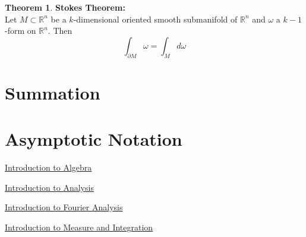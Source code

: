 \documentclass{book}
\theoremstyle{definition}
\newtheorem{thm}[definition]{Theorem}
\newcommand{\om}{\omega}
\newcommand{\R}{\mathbb{R}}
\DeclareMathOperator*{\0}{\mbf{0}}
\DeclareMathOperator*{\1}{\mbf{1}}
\begin{document}
	\begin{thm}\textbf{Stokes Theorem:}\\
		Let $M \subset \R^n$ be a $k$-dimensional oriented smooth submanifold of $\R^n$ and $\om$ a $k-1$-form on $\R^n$. Then $$\int_{\partial M} \om = \int_M d \om$$
	\end{thm}



	

\appendix

\chapter{Summation}


\newpage	

\chapter{Asymptotic Notation}








\backmatter
\begin{thebibliography}{4}
	 \href{https://github.com/carsonaj/Mathematics/blob/master/Introduction\%20to\%20Algebra/Introduction\%20to\%20Algebra.pdf}{Introduction to Algebra}
	
	  \href{https://github.com/carsonaj/Mathematics/blob/master/Introduction\%20to\%20Analysis/Introduction\%20to\%20Analysis.pdf}{Introduction to Analysis}	
	
	  \href{https://github.com/carsonaj/Mathematics/blob/master/Introduction\%20to\%20Fourier\%20Analysis/Introduction\%20to\%20Fourier\%20Analysis.pdf}{Introduction to Fourier Analysis}
	
	  \href{https://github.com/carsonaj/Mathematics/blob/master/Introduction\%20to\%20Measure\%20and\%20Integration/Introduction\%20to\%20Measure\%20and\%20Integration.pdf}{Introduction to Measure and Integration}
	
	
	
\end{thebibliography}
\end{document}
